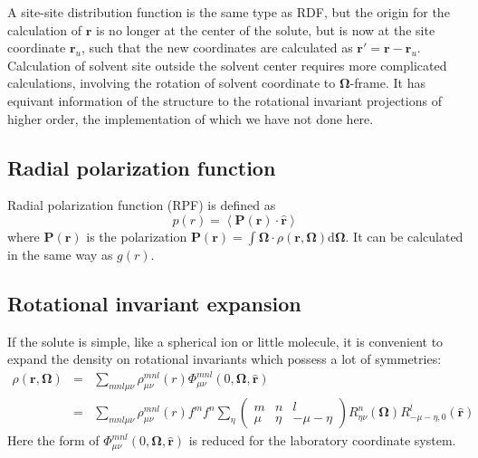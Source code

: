 A site-site distribution function is the same type as \acs{RDF},
but the origin for the calculation of $\mathbf{r}$ is no longer at
the center of the solute, but is now at the site coordinate $\mathbf{r}_{u}$,
such that the new coordinates are calculated as $\mathbf{r}'=\mathbf{r}-\mathbf{r}_{u}$.
Calculation of solvent site outside the solvent center requires more
complicated calculations, involving the rotation of solvent coordinate
to $\mathbf{\Omega}$-frame. It has equivant information of the structure
to the rotational invariant projections of higher order, the implementation
of which we have not done here.

\subsection{Radial polarization function}

Radial polarization function (\acs{RPF}) is defined as 
\begin{equation}
p(r)=\left\langle \mathbf{P}(\mathbf{r})\cdot\hat{\mathbf{r}}\right\rangle 
\end{equation}
where $\mathbf{P}(\mathbf{r})$ is the polarization $\mathbf{P}(\mathbf{r})=\int\mathbf{\Omega}\cdot\rho(\mathbf{r},\mathbf{\Omega})\mathrm{d}\mathbf{\Omega}$.
It can be calculated in the same way as $g(r)$.

\subsection{Rotational invariant expansion}

If the solute is simple, like a spherical ion or little molecule,
it is convenient to expand the density on rotational invariants which
possess a lot of symmetries:
\begin{eqnarray}
\rho(\mathbf{r},\mathbf{\Omega}) & = & \sum_{mnl\mu\nu}\rho_{\mu\nu}^{mnl}(r)\Phi_{\mu\nu}^{mnl}(0,\mathbf{\Omega},\mathbf{\hat{r}})\label{eq:rot_invar_expansion}\\
 & = & \sum_{mnl\mu\nu}\rho_{\mu\nu}^{mnl}(r)f^{m}f^{n}\sum_{\eta}\left(\begin{array}{ccc}
m & n & l\\
\mu & \eta & -\mu-\eta
\end{array}\right)R_{\eta\nu}^{n}(\mathbf{\Omega})R_{-\mu-\eta,0}^{l}(\mathbf{\hat{r}})
\end{eqnarray}
Here the form of $\Phi_{\mu\nu}^{mnl}(0,\mathbf{\Omega},\mathbf{\hat{r}})$
is reduced for the laboratory coordinate system. 

